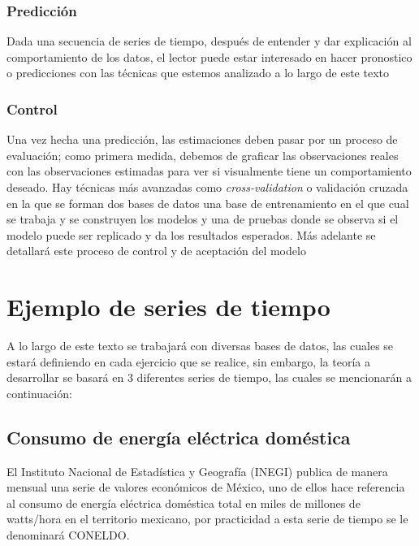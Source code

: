 \documentclass[
  spanish,
]{book}
\theoremstyle{remark}
\begin{document}
\hypertarget{predicciuxf3n}{%
\subsubsection*{Predicción}\label{predicciuxf3n}}

Dada una secuencia de series de tiempo, después de entender y dar explicación al comportamiento de los datos, el lector puede estar interesado en hacer pronostico o predicciones con las técnicas que estemos analizado a lo largo de este texto

\hypertarget{control}{%
\subsubsection*{Control}\label{control}}

Una vez hecha una predicción, las estimaciones deben pasar por un proceso de evaluación; como primera medida, debemos de graficar las observaciones reales con las observaciones estimadas para ver si visualmente tiene un comportamiento deseado. Hay técnicas más avanzadas como \emph{cross-validation} o validación cruzada en la que se forman dos bases de datos una base de entrenamiento en el que cual se trabaja y se construyen los modelos y una de pruebas donde se observa si el modelo puede ser replicado y da los resultados esperados. Más adelante se detallará este proceso de control y de aceptación del modelo

\hypertarget{ejemplo-de-series-de-tiempo}{%
\section{Ejemplo de series de tiempo}\label{ejemplo-de-series-de-tiempo}}

A lo largo de este texto se trabajará con diversas bases de datos, las cuales se estará definiendo en cada ejercicio que se realice, sin embargo, la teoría a desarrollar se basará en 3 diferentes series de tiempo, las cuales se mencionarán a continuación:

\hypertarget{coneldo}{%
\subsection{Consumo de energía eléctrica doméstica}\label{coneldo}}

El Instituto Nacional de Estadística y Geografía (INEGI) publica de manera mensual una serie de valores económicos de México, uno de ellos hace referencia al consumo de energía eléctrica doméstica total en miles de millones de watts/hora en el territorio mexicano, por practicidad a esta serie de tiempo se le denominará CONELDO.
\end{document}
